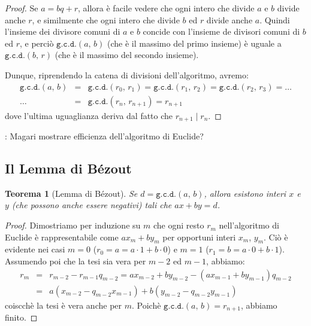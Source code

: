 \documentclass[pdflatex,11pt,a4paper,oneside]{article}
\newcommand{\XXX}[1][XXX]{\text{\bfseries{\color{red}{\emph{#1}}}}}
\newcommand{\TODO}[0]{\XXX[TODO]}
\newcommand{\p}[1]{\left({#1}\right)}
\newcommand{\divides}[0]{\mid}
\newcommand{\gcdop}[0]{\ensuremath{\mathtt{g.c.d.}}}
\newcommand{\xgcd}[1]{\ensuremath{\gcdop\left({#1}\right)}}
\renewcommand{\gcd}[2]{\xgcd{{#1},\,{#2}}}
\newtheorem{theorem}[TheoremLike]{Teorema}
\begin{document}
\begin{proof}
Se $a = bq + r$, allora \`e facile vedere che ogni intero che divide
$a$ e $b$ divide anche $r$, e similmente che ogni intero che divide $b$
ed $r$ divide anche $a$.  Quindi l'insieme dei divisore comuni di $a$ e
$b$ concide con l'insieme de divisori comuni di $b$ ed $r$, e perci\`o
$\gcd{a}{b}$ (che \`e il massimo del primo insieme) \`e uguale a
$\gcd{b}{r}$ (che \`e il massimo del secondo insieme).

\smallskip
\noindent
Dunque, riprendendo la catena di divisioni dell'algoritmo, avremo:
\begin{eqnarray*}
  \gcd{a}{b}
    & =
    & \gcd{r_0}{r_1} = \gcd{r_1}{r_2} = \gcd{r_2}{r_3} = \ldots \\
  \ldots
    & =
    & \gcd{r_n}{r_{n+1}} = r_{n+1}
\end{eqnarray*}
dove l'ultima uguaglianza deriva dal fatto che $r_{n+1} \divides r_n$.
\end{proof}

\noindent
\TODO: Magari mostrare efficienza dell'algoritmo di Euclide?


\subsection{Il Lemma di B\'ezout}

\begin{theorem}[Lemma di B\'ezout]\label{thm:lemma-bezout}
Se $d = \gcd{a}{b}$, allora esistono interi $x$ e $y$ (che possono
anche essere negativi) tali che $ax + by = d$.
\end{theorem}
%
\begin{proof}
Dimostriamo per induzione su $m$ che ogni resto $r_m$ nell'algoritmo
di Euclide \`e rappresentabile come $ax_m + by_m$ per opportuni interi
$x_m$, $y_m$. Ci\`o \`e evidente nei casi $m = 0$ ($r_0 = a = a \cdot 1 +
b \cdot 0$) e $m = 1$ ($r_1 = b = a \cdot 0 + b \cdot 1$). Assumendo poi
che la tesi sia vera per $m - 2$ ed $m - 1$, abbiamo:
\begin{eqnarray*}
r_m & = & r_{m-2} - r_{m-1} q_{m-2} = ax_{m-2} + by_{m-2} -
                                      \p{ax_{m-1} + by_{m-1}} q_{m-2} \\
& = &
a\p{x_{m-2} - q_{m-2}x_{m-1}} + b\p{y_{m-2} - q_{m-2}y_{m-1}}
\end{eqnarray*}
coiscch\`e la tesi \`e vera anche per $m$.  Poich\`e $\gcd{a}{b} =
r_{n+1}$, abbiamo finito.
\end{proof}
\end{document}
